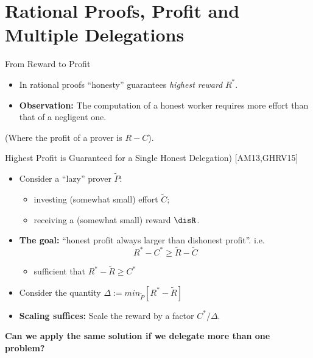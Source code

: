 \section{Rational Proofs, Profit and Multiple Delegations}

\begin{frame}{From Reward to Profit}
		\begin{itemize}[<+- | alert@+>]

			\item In rational proofs ``honesty'' guarantees \textit{highest reward} $R^*$.
			\item \textbf{Observation:} The computation of a honest worker requires more effort than that of a negligent one.
		\end{itemize}
		\pause	
		\bigskip
		
		\pause
		
		(Where the profit of a prover is $R-C$).
\end{frame}

\begin{frame}{Highest Profit is Guaranteed for a Single Honest Delegation) [AM13,GHRV15]}

	\begin{itemize}[<+- | alert@+>]
		\item Consider a ``lazy'' prover $\tilde{P}$:
		\begin{itemize} 
			\item investing (somewhat small) effort $\tilde{C}$;
			\item receiving a (somewhat small) reward $\disR$. 
		\end{itemize}
		
		\item \textbf{The goal:} ``honest profit always larger than dishonest profit''. \onslide<+-> i.e.
		$$R^*-C^* \geq \tilde{R}-\tilde{C}$$
		\begin{itemize}
			\item sufficient that $R^* - \tilde{R} \geq C^*$
		\end{itemize}
		
		\item Consider the quantity $\Delta := min_{\tilde{P}}[R^*-\tilde{R}]$
		
		
		\item \textbf{Scaling suffices:} Scale the reward by a factor $C^*/\Delta$.
	\end{itemize}
	
	\onslide<+->
	\bigskip
	\noindent
	\large{\textbf{Can we apply the same solution if we delegate more than one problem?}}
\end{frame}


